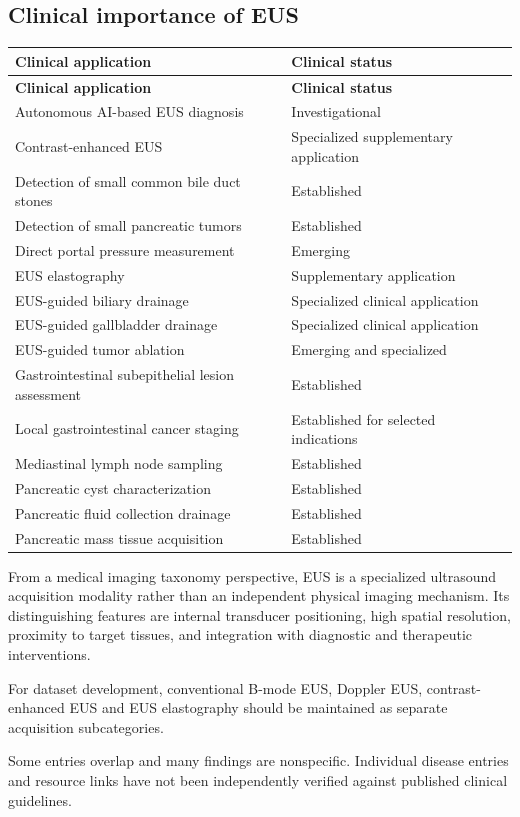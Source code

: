 \subsection{Clinical importance of EUS}
\begin{longtable}{@{}p{}p{}@{}}
\toprule
\textbf{Clinical application} & \textbf{Clinical status} \\
\midrule
\endfirsthead
\toprule
\textbf{Clinical application} & \textbf{Clinical status} \\
\midrule
\endhead
Autonomous AI-based EUS diagnosis & Investigational \\
Contrast-enhanced EUS & Specialized supplementary application \\
Detection of small common bile duct stones & Established \\
Detection of small pancreatic tumors & Established \\
Direct portal pressure measurement & Emerging \\
EUS elastography & Supplementary application \\
EUS-guided biliary drainage & Specialized clinical application \\
EUS-guided gallbladder drainage & Specialized clinical application \\
EUS-guided tumor ablation & Emerging and specialized \\
Gastrointestinal subepithelial lesion assessment & Established \\
Local gastrointestinal cancer staging & Established for selected indications \\
Mediastinal lymph node sampling & Established \\
Pancreatic cyst characterization & Established \\
Pancreatic fluid collection drainage & Established \\
Pancreatic mass tissue acquisition & Established \\
\bottomrule
\end{longtable}

From a medical imaging taxonomy perspective, EUS is a specialized ultrasound acquisition modality rather than an independent physical imaging mechanism. Its distinguishing features are internal transducer positioning, high spatial resolution, proximity to target tissues, and integration with diagnostic and therapeutic interventions.

For dataset development, conventional B-mode EUS, Doppler EUS, contrast-enhanced EUS and EUS elastography should be maintained as separate acquisition subcategories.

 Some entries overlap and many findings are nonspecific. Individual disease entries and resource links have not been independently verified against published clinical guidelines.


